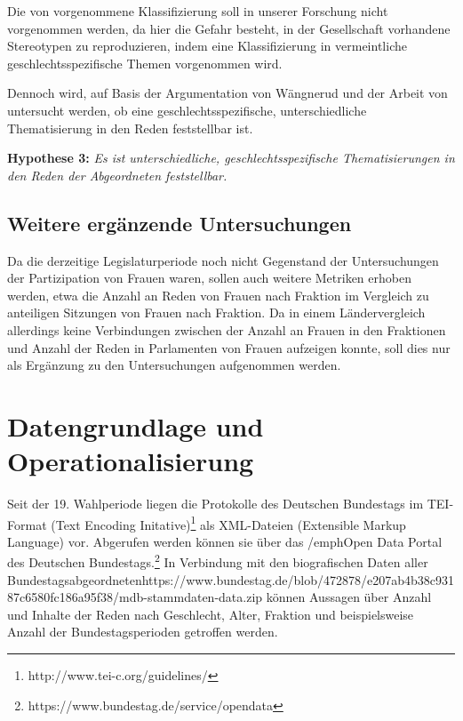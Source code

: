 \documentclass[12pt, 
    twoside=false, 
    bibliography=totoc, 
    numbers=endperiod, 
    headings=normal, 
    toc=chapterentrydotfill
    ]{scrbook}
\begin{document}
Die von \textcite{back_2014} vorgenommene Klassifizierung soll in unserer Forschung nicht vorgenommen werden, da hier die Gefahr besteht, in der Gesellschaft vorhandene Stereotypen zu reproduzieren, indem eine Klassifizierung in vermeintliche geschlechtsspezifische Themen vorgenommen wird.

Dennoch wird, auf Basis der Argumentation von Wängnerud \parencites*{wangnerud_2000} {wangnerud_2009} und der Arbeit von \textcite{back_2014} untersucht werden, ob eine geschlechtsspezifische, unterschiedliche Thematisierung in den Reden feststellbar ist. 

\textbf{Hypothese 3:} \emph{Es ist unterschiedliche, geschlechtsspezifische Thematisierungen in den Reden der Abgeordneten feststellbar.}

\section{Weitere ergänzende Untersuchungen}

Da die derzeitige Legislaturperiode noch nicht Gegenstand der Untersuchungen der Partizipation von Frauen waren, sollen auch weitere Metriken erhoben werden, etwa die Anzahl an Reden von Frauen nach Fraktion im Vergleich zu anteiligen Sitzungen von Frauen nach Fraktion. Da \textcite{back_2018} in einem Ländervergleich allerdings keine Verbindungen zwischen der Anzahl an Frauen in den Fraktionen und Anzahl der Reden in Parlamenten von Frauen aufzeigen konnte, soll dies nur als Ergänzung zu den Untersuchungen aufgenommen werden.

\chapter{Datengrundlage und Operationalisierung}

Seit der 19. Wahlperiode liegen die Protokolle des Deutschen Bundestags im TEI-Format (Text Encoding Initative)\footnote{http://www.tei-c.org/guidelines/} als XML-Dateien (Extensible Markup Language) vor. Abgerufen werden können sie über das /emph{Open Data Portal} des Deutschen Bundestags.\footnote{https://www.bundestag.de/service/opendata} In Verbindung mit den biografischen Daten aller Bundestagsabgeordneten{https://www.bundestag.de/blob/472878/e207ab4b38c93187c6580fc186a95f38/mdb-stammdaten-data.zip} können Aussagen über Anzahl und Inhalte der Reden nach Geschlecht, Alter, Fraktion und beispielsweise Anzahl der Bundestagsperioden getroffen werden.
\end{document}
